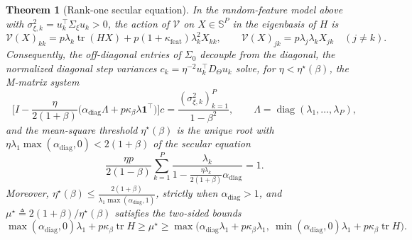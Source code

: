 \documentclass[11pt]{article}
\newtheorem{theorem}{Theorem}
\theoremstyle{remark}
\newcommand{\tr}{\operatorname{tr}}
\begin{document}
\begin{theorem}[Rank-one secular equation]\label{thm:secular}
In the random-feature model above with $\sigma_{\xi,k}^2 = u_k^\top \Sigma_\xi u_k > 0$, the action of $\mathcal V$ on $X \in \mathbb S^P$ in the eigenbasis of $H$ is
\begin{equation}\label{eq:V-rf}
\mathcal V(X)_{kk} = p\lambda_k\tr(HX) + p(1+\kappa_{\mathrm{feat}})\lambda_k^2 X_{kk}, \qquad \mathcal V(X)_{jk} = p\lambda_j\lambda_k X_{jk} \quad (j \ne k).
\end{equation}
Consequently, the off-diagonal entries of $\Sigma_0$ decouple from the diagonal, the normalized diagonal step variances $c_k = \eta^{-2}u_k^\top D_\Theta u_k$ solve, for $\eta<\eta^\star(\beta)$, the M-matrix system
\[
\Big[I - \frac{\eta}{2(1+\beta)}\big(\alpha_{\mathrm{diag}}\Lambda + p\kappa_\beta \lambda\mathbf 1^\top\big)\Big]c = \frac{(\sigma_{\xi,k}^2)_{k=1}^P}{1-\beta^2}, \qquad \Lambda = \operatorname{diag}(\lambda_1,\dots,\lambda_P),
\]
and the mean-square threshold $\eta^\star(\beta)$ is the unique root with $\eta\lambda_1\max(\alpha_{\mathrm{diag}},0) < 2(1+\beta)$ of the secular equation
\begin{equation}\label{eq:secular}
\frac{\eta p}{2(1-\beta)}\sum_{k=1}^P \frac{\lambda_k}{1 - \frac{\eta\lambda_k}{2(1+\beta)}\alpha_{\mathrm{diag}}} = 1.
\end{equation}
Moreover, $\eta^\star(\beta) \le \frac{2(1+\beta)}{\lambda_1\max(\alpha_{\mathrm{diag}},1)}$, strictly when $\alpha_{\mathrm{diag}}>1$, and $\mu^\star \triangleq 2(1+\beta)/\eta^\star(\beta)$ satisfies the two-sided bounds
\begin{equation}\label{eq:sandwich}
\max(\alpha_{\mathrm{diag}},0)\lambda_1 + p\kappa_\beta\tr H \ge \mu^\star \ge \max\Big(\alpha_{\mathrm{diag}}\lambda_1 + p\kappa_\beta\lambda_1,\ \min(\alpha_{\mathrm{diag}},0)\lambda_1 + p\kappa_\beta\tr H\Big).
\end{equation}
\end{theorem}
\end{document}
